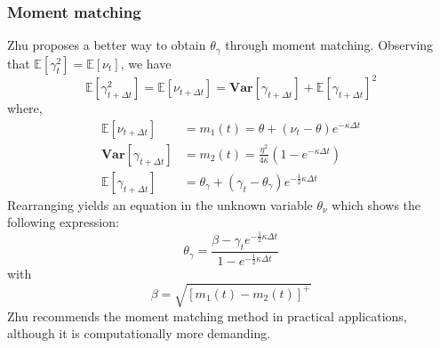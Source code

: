 \documentclass[12pt]{article}
\numberwithin{equation}{section}
\begin{document}
\subsubsection*{Moment matching}
Zhu proposes a better way to obtain $\theta_\gamma$ through moment matching. Observing that $\mathbb{E}[\gamma_t^2]=\mathbb{E}[\nu_t]$, we have
\begin{equation*}
\mathbb{E}[\gamma_{t+\Delta t}^2]=\mathbb{E}[\nu_{t+\Delta t}] =\textbf{Var}[\gamma_{t+\Delta t}] + \mathbb{E}[\gamma	_{t+\Delta t}]^2
\end{equation*}
where,
\begin{align*}
\mathbb{E}[\nu_{t+\Delta t}] &= m_1(t) = \theta + (\nu_t - \theta)e^{-\kappa \Delta t} \\
\textbf{Var}[\gamma_{t+\Delta t}] &=  m_2(t) = \frac{\eta^2}{4\kappa}(1-e^{-\kappa \Delta t}) \\
\mathbb{E}[\gamma_{t+\Delta t}] &= \theta_\gamma + (\gamma_t - \theta_\gamma)e^{-\frac{1}{2}\kappa\Delta t}
\end{align*}
Rearranging yields an equation in the unknown variable $\theta_\nu$ which shows the following expression:
\begin{equation*}
\theta_\gamma = \frac{\beta - \gamma_te^{-\frac{1}{2}\kappa\Delta t}}{1-e^{-\frac{1}{2}\kappa\Delta t}}
\end{equation*}
with
\begin{equation*}
\beta = \sqrt{[m_1(t)-m_2(t)]^+}
\end{equation*}
Zhu recommends the moment matching method in practical applications, although it is computationally more demanding.
\end{document}
